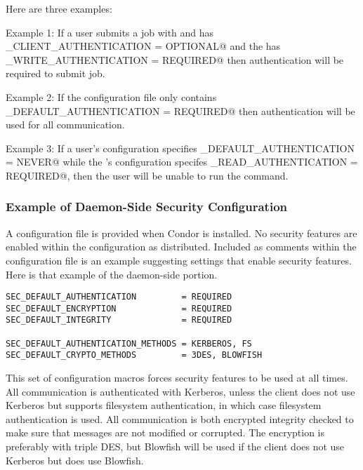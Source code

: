 Here are three examples:

Example 1: If a user submits a job with  and has
\verb@SEC_CLIENT_AUTHENTICATION = OPTIONAL@ and the 
has \verb@SEC_WRITE_AUTHENTICATION = REQUIRED@ then authentication
will be required to submit job. 

Example 2: If the configuration file only contains
\verb@SEC_DEFAULT_AUTHENTICATION = REQUIRED@ then authentication will
be used for all communication. 

Example 3: If a user's configuration specifies
\verb@SEC_DEFAULT_AUTHENTICATION = NEVER@ while the
's configuration specifes
\verb@SEC_READ_AUTHENTICATION = REQUIRED@, then the user will be
unable to run the  command.



\subsubsection{\label{sec:Security-sample1} Example of Daemon-Side Security Configuration}

A configuration file is provided when Condor is installed.
No security features are enabled within the configuration as
distributed.
Included as comments within the configuration file is an example 
suggesting settings that enable security features.
Here is that example of the daemon-side portion.

\footnotesize
\begin{verbatim}
SEC_DEFAULT_AUTHENTICATION         = REQUIRED
SEC_DEFAULT_ENCRYPTION             = REQUIRED
SEC_DEFAULT_INTEGRITY              = REQUIRED

SEC_DEFAULT_AUTHENTICATION_METHODS = KERBEROS, FS
SEC_DEFAULT_CRYPTO_METHODS         = 3DES, BLOWFISH
\end{verbatim}
\normalsize

This set of configuration macros forces security features
to be used at all times.
All communication is authenticated with Kerberos, unless the client
does not use Kerberos but supports filesystem authentication, in
which case filesystem authentication is used.
All communication is both encrypted integrity checked to make sure
that messages are not modified or corrupted. 
The encryption is preferably with triple DES, but Blowfish will be
used if the client does not use Kerberos but does use Blowfish.

